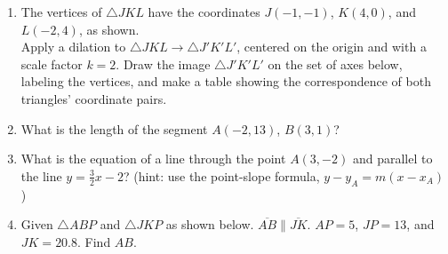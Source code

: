 \documentclass[12pt, twoside]{article}
\begin{document}
\begin{enumerate}
\newpage
  \item The vertices of $\triangle JKL$ have the coordinates $J(-1,-1)$, $K(4,0)$, and $L(-2,4)$, as shown. \\[0.25cm]
    Apply a dilation to $\triangle JKL \rightarrow \triangle J'K'L'$, centered on the origin and with a scale factor $k=2$. Draw the image $\triangle J'K'L'$ on the set of axes below, labeling the vertices, and make a table showing the correspondence of both triangles' coordinate pairs.  \vspace{5cm}
    \begin{center}
    \end{center}

\newpage
\item What is the length of the segment $A(-2,13)$, $B(3,1)$?
  \vspace{6cm}

\item What is the equation of a line through the point $A(3,-2)$ and parallel to the line $y=\frac{3}{2}x-2$? (hint: use the point-slope formula, $y-y_A=m (x-x_A)$) \vspace{2.5cm}

\item Given $\triangle ABP$ and $\triangle JKP$ as shown below. $\overline{AB} \parallel \overline{JK}$. $AP=5$, $JP=13$, and $JK=20.8$. Find $AB$.
\begin{center}
    \end{center}
\vspace{2cm}

\newpage


\end{enumerate}
\end{document}
